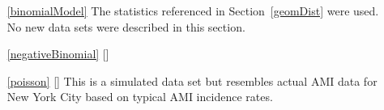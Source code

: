 \begin{itemize}
\item[\ref{binomialModel}]
    The statistics referenced in Section~\ref{geomDist} were used.
    No new data sets were described in this section.
    
\item[\ref{negativeBinomial}]
    [\datalink{}]

\item[\ref{poisson}]
    [\datalink{ami\_occurrences}]
    This is a simulated data set but resembles actual
    AMI data for New York City based on typical AMI
    incidence rates.
\end{itemize}








\section{}
\label{ch_foundations_for_inf_data}

